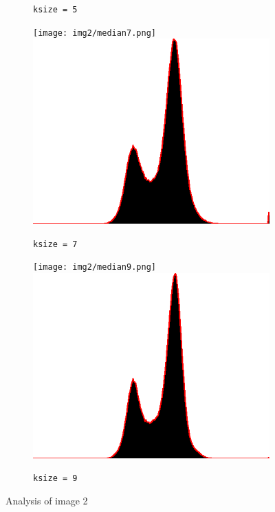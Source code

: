 \begin{figure}[H]
\begin{subfigure}[b]{0.24\textwidth}
        \caption{\lstinline|ksize = 5|}
        \label{fig:img2_kernel5}
    \end{subfigure}
    \begin{subfigure}[b]{0.24\textwidth}
        \texttt{[image: img2/median7.png]}\\[0.1cm]
        \includegraphics[width=\textwidth]{img2/kernel7.png}
        \caption{\lstinline|ksize = 7|}
        \label{fig:img2_kernel7}
    \end{subfigure}
    \begin{subfigure}[b]{0.24\textwidth}
        \texttt{[image: img2/median9.png]}\\[0.1cm]
        \includegraphics[width=\textwidth]{img2/kernel9.png}
        \caption{\lstinline|ksize = 9|}
        \label{fig:img2_kernel9}
    \end{subfigure}
    \caption{Analysis of image 2}\label{fig:img2}
\end{figure}
